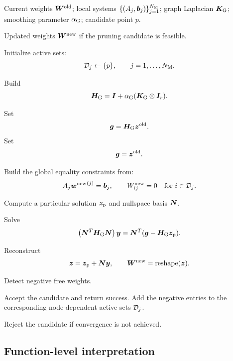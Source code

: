 \documentclass[11pt,a4paper]{article}
\begin{document}
\begin{algorithm}[H]
\caption{Graph-regularized active-set redistribution for one pruning candidate}
\label{alg:graph_regularized_pruning}
\begin{algorithmic}[1]

\Require
Current weights $\bm W^{\mathrm{old}}$;
local systems $\{(A_j,\bm b_j)\}_{j=1}^{N_{\mathrm{M}}}$;
graph Laplacian $\bm K_{\mathrm{G}}$;
smoothing parameter $\alpha_{\mathrm{G}}$;
candidate point $p$.

\Ensure
Updated weights $\bm W^{\mathrm{new}}$ if the pruning candidate is feasible.

\State Initialize active sets:
\[
        \mathcal{D}_j\gets\{p\},
        \qquad
        j=1,\ldots,N_{\mathrm{M}}.
\]

\State Build
\[
        \bm H_{\mathrm{G}}
        =
        \bm I+\alpha_{\mathrm{G}}(\bm K_{\mathrm{G}}\otimes\bm I_r).
\]

    \State Set
    \[
        \bm g=\bm H_{\mathrm{G}}\bm z^{\mathrm{old}}.
    \]
\Else
    \State Set
    \[
        \bm g=\bm z^{\mathrm{old}}.
    \]
\EndIf


    \State Build the global equality constraints from:
    \[
        A_j{\bm w^{\mathrm{new}}}^{(j)}=\bm b_j,
        \qquad
        W^{\mathrm{new}}_{ij}=0
        \quad
        \text{for } i\in\mathcal{D}_j.
    \]

    \State Compute a particular solution $\bm z_{\mathrm{p}}$ and nullspace basis $\bm N$.

    \State Solve
    \[
        \left(\bm N^T\bm H_{\mathrm{G}}\bm N\right)\bm y
        =
        \bm N^T(\bm g-\bm H_{\mathrm{G}}\bm z_{\mathrm{p}}).
    \]

    \State Reconstruct
    \[
        \bm z=\bm z_{\mathrm{p}}+\bm N\bm y,
        \qquad
        \bm W^{\mathrm{new}}=\operatorname{reshape}(\bm z).
    \]

    \State Detect negative free weights.

        \State Accept the candidate and return success.
    \Else
        \State Add the negative entries to the corresponding node-dependent
        active sets $\mathcal{D}_j$.
    \EndIf

\EndFor

\State Reject the candidate if convergence is not achieved.

\end{algorithmic}
\end{algorithm}

\subsection{Function-level interpretation}
\end{document}
